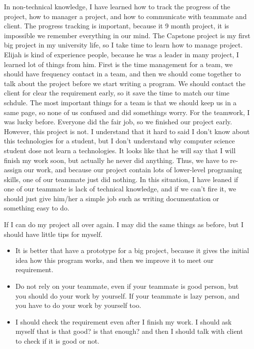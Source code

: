 In non-technical knowledge, I have learned how to track the progress of the project, how to manager a project, and how to communicate with teammate and client. 
The progress tracking is important, because it 9 month project, it is impossible we remember everything in our mind.
The Capstone project is my first big project in my university life, so I take time to learn how to manage project. 
Elijah is kind of experience people, because he was a leader in many project, I learned lot of things from him.
First is the time management for a team, we should have frequency contact in a team, and then we should come together to talk about the project before we start writing a program.
We should contact the client for clear the requirement early, so it save the time to match our time schdule.
The most important things for a team is that we should keep us in a same page, so none of us confused and did somethings worry.
For the teamwork, I was lucky before. Everyone did the fair job, so we finished our project early.
However, this project is not. 
I understand that it hard to said I don't know about this technologies for a student, but I don't understand why computer science student dose not learn a technologies.
It looks like that he will say that I will finish my work soon, but actually he never did anything.
Thus, we have to re-assign our work, and because our project contain lots of lower-level programing skills, one of our teammate just did nothing.
In this situation, I have leaned if one of our teammate is lack of technical knowledge, and if we can't fire it, we should just give him/her a simple job such as writing documentation or something easy to do.


If I can do my project all over again. I may did the same things as before, but I should have little tips for myself.
\begin{itemize}
	\item It is better that have a prototype for a big project, because it gives the initial idea how this program works, and then we improve it to meet our requirement.
	\item Do not rely on your teammate, even if your teammate is good person, but you should do your work by yourself. If your teammate is lazy person, and you have to do your work by yourself too.
	\item I should check the requirement even after I finish my work. I should ask myself that is that good? is that enough? and then I should talk with client to check if it is good or not.
\end{itemize}
